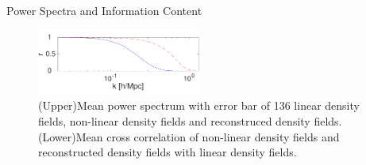 \begin{section}{Power Spectra and Information Content}
\begin{figure}[t!]
\begin{center}
\end{center}
\begin{flushright}
\includegraphics[width=0.48\textwidth,height=0.1\textwidth]{correlation_good-crop.pdf}
\end{flushright}
\caption{(Upper)Mean power spectrum with error bar of 136 linear density fields, non-linear 
density fields and reconstruced density fields.(Lower)Mean cross correlation of non-linear 
density fields and reconstructed density fields with linear density fields.}
\end{figure}


\end{section}
